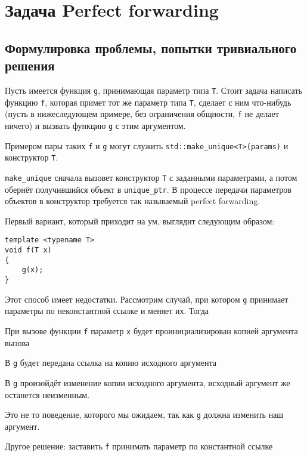 \section{Задача Perfect forwarding}

\subsection{Формулировка проблемы, попытки тривиального решения}

Пусть имеется функция \texttt{g}, принимающая параметр типа \texttt{T}. Стоит задача написать функцию \texttt{f}, которая примет тот же параметр типа \texttt{T}, сделает с ним что-нибудь (пусть в нижеследующем примере, без ограничения общности, \texttt{f} не делает ничего) и вызвать функцию \texttt{g} с этим аргументом.

Примером пары таких \texttt{f} и \texttt{g} могут служить \texttt{std::make_unique<T>(params)} и конструктор \texttt{T}.

\texttt{make_unique} сначала вызовет конструктор \texttt{T} с заданными параметрами, а потом обернёт получившийся объект в \texttt{unique_ptr}. В процессе передачи параметров объектов в конструктор требуется так называемый perfect forwarding.

Первый вариант, который приходит на ум, выглядит следующим образом:

\begin{verbatim}
template <typename T>
void f(T x)
{
	g(x);
}
\end{verbatim}

Этот способ имеет недостатки. Рассмотрим случай, при котором \texttt{g} принимает параметры по неконстантной ссылке и меняет их. Тогда

При вызове функции \texttt{f} параметр \texttt{x} будет проинициализирован копией аргумента вызова

В \texttt{g} будет передана ссылка на копию исходного аргумента

В \texttt{g} произойдёт изменение копии исходного аргумента, исходный аргумент же останется неизменным.

Это не то поведение, которого мы ожидаем, так как \texttt{g} должна изменить наш аргумент.

Другое решение: заставить \texttt{f} принимать параметр по константной ссылке


